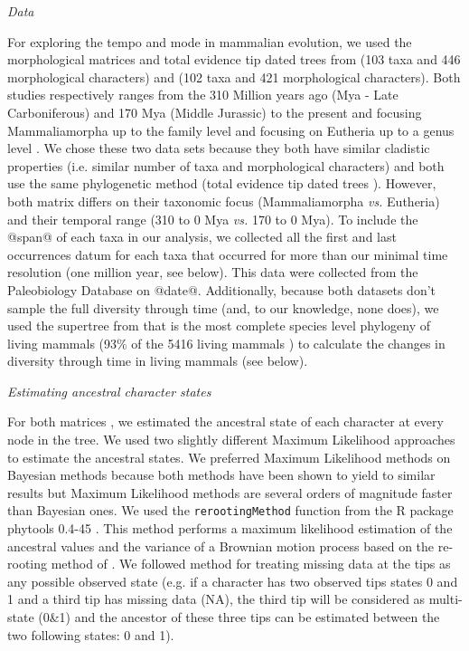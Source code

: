 \documentclass[12pt,letterpaper]{article}
\renewcommand{\subsection}[1]{%
\bigskip
\begin{center}
\begin{large}
\normalfont\itshape #1
\end{large}
\end{center}}
\begin{document}
\subsection{Data}
For exploring the tempo and mode in mammalian evolution, we used the morphological matrices and total evidence tip dated trees \cite{ronquista2012} from \cite{MEE3:MEE312084} (103 taxa and 446 morphological characters) and \cite{beckancient2014} (102 taxa and 421 morphological characters). Both studies respectively ranges from the 310 Million years ago (Mya - Late Carboniferous) and 170 Mya (Middle Jurassic) to the present and focusing Mammaliamorpha up to the family level \cite{MEE3:MEE312084} and focusing on Eutheria up to a genus level \cite{beckancient2014}. We chose these two data sets because they both have similar cladistic properties (i.e. similar number of taxa and morphological characters) and both use the same phylogenetic method (total evidence tip dated trees \cite{ronquista2012}). However, both matrix differs on their taxonomic focus (Mammaliamorpha \textit{vs.} Eutheria) and their temporal range (310 to 0 Mya \textit{vs.} 170 to 0 Mya). To include the @span@ of each taxa in our analysis, we collected all the first and last occurrences datum for each taxa that occurred for more than our minimal time resolution (one million year, see below). This data were collected from the Paleobiology Database on @date@. Additionally, because both datasets don't sample the full diversity through time (and, to our knowledge, none does), we used the supertree from \cite{fritzdiversity2013} that is the most complete species level phylogeny of living mammals (93\% of the 5416 living mammals \cite{wilson2005mammal}) to calculate the changes in diversity through time in living mammals (see below).

\subsection{Estimating ancestral character states}
For both matrices \cite{MEE3:MEE312084,beckancient2014}, we estimated the ancestral state of each character at every node in the tree. We used two slightly different Maximum Likelihood approaches to estimate the ancestral states. We preferred Maximum Likelihood methods on Bayesian methods because both methods have been shown to yield to similar results \cite{royer-carenzichoosing2013} but Maximum Likelihood methods are several orders of magnitude faster than Bayesian ones. We used the \texttt{rerootingMethod} function from the R package phytools 0.4-45 \cite{phytools}. This method performs a maximum likelihood estimation of the ancestral values and the variance of a Brownian motion process based on the re-rooting method of \cite{Yang01121995}. We followed \cite{Claddis} method for treating missing data at the tips as any possible observed state (e.g. if a character has two observed tips states 0 and 1 and a third tip has missing data (NA), the third tip will be considered as multi-state (0\&1) and the ancestor of these three tips can be estimated between the two following states: 0 and 1).
\end{document}

